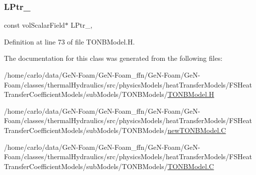 \subsubsection{\texorpdfstring{L\+Ptr\+\_\+}{LPtr\_}}
{\footnotesize\ttfamily const vol\+Scalar\+Field$\ast$ L\+Ptr\+\_\+\hspace{0.3cm}{\ttfamily [mutable]}, {\ttfamily [protected]}}



Definition at line 73 of file T\+O\+N\+B\+Model.\+H.



The documentation for this class was generated from the following files\+:\begin{DoxyCompactItemize}
\item 
/home/carlo/data/\+Ge\+N-\/\+Foam/\+Ge\+N-\/\+Foam\+\_\+ffn/\+Ge\+N-\/\+Foam/\+Ge\+N-\/\+Foam/classes/thermal\+Hydraulics/src/physics\+Models/heat\+Transfer\+Models/\+F\+S\+Heat\+Transfer\+Coefficient\+Models/sub\+Models/\+T\+O\+N\+B\+Models/\hyperlink{TONBModel_8H}{T\+O\+N\+B\+Model.\+H}\item 
/home/carlo/data/\+Ge\+N-\/\+Foam/\+Ge\+N-\/\+Foam\+\_\+ffn/\+Ge\+N-\/\+Foam/\+Ge\+N-\/\+Foam/classes/thermal\+Hydraulics/src/physics\+Models/heat\+Transfer\+Models/\+F\+S\+Heat\+Transfer\+Coefficient\+Models/sub\+Models/\+T\+O\+N\+B\+Models/\hyperlink{newTONBModel_8C}{new\+T\+O\+N\+B\+Model.\+C}\item 
/home/carlo/data/\+Ge\+N-\/\+Foam/\+Ge\+N-\/\+Foam\+\_\+ffn/\+Ge\+N-\/\+Foam/\+Ge\+N-\/\+Foam/classes/thermal\+Hydraulics/src/physics\+Models/heat\+Transfer\+Models/\+F\+S\+Heat\+Transfer\+Coefficient\+Models/sub\+Models/\+T\+O\+N\+B\+Models/\hyperlink{TONBModel_8C}{T\+O\+N\+B\+Model.\+C}\end{DoxyCompactItemize}
